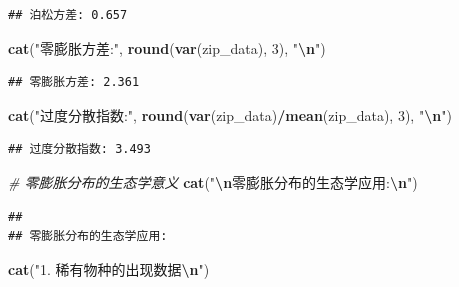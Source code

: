 \documentclass[
  twoside]{book}
\newenvironment{Shaded}{\begin{snugshade}}{\end{snugshade}}
\newcommand{\CommentTok}[1]{\textcolor[rgb]{0.56,0.35,0.01}{\textit{#1}}}
\newcommand{\DecValTok}[1]{\textcolor[rgb]{0.00,0.00,0.81}{#1}}
\newcommand{\FunctionTok}[1]{\textcolor[rgb]{0.13,0.29,0.53}{\textbf{#1}}}
\newcommand{\NormalTok}[1]{#1}
\newcommand{\SpecialCharTok}[1]{\textcolor[rgb]{0.81,0.36,0.00}{\textbf{#1}}}
\newcommand{\StringTok}[1]{\textcolor[rgb]{0.31,0.60,0.02}{#1}}
\begin{document}
\begin{verbatim}
## 泊松方差: 0.657
\end{verbatim}

\begin{Shaded}
\begin{Highlighting}[]
\FunctionTok{cat}\NormalTok{(}\StringTok{"零膨胀方差:"}\NormalTok{, }\FunctionTok{round}\NormalTok{(}\FunctionTok{var}\NormalTok{(zip\_data), }\DecValTok{3}\NormalTok{), }\StringTok{"}\SpecialCharTok{\textbackslash{}n}\StringTok{"}\NormalTok{)}
\end{Highlighting}
\end{Shaded}

\begin{verbatim}
## 零膨胀方差: 2.361
\end{verbatim}

\begin{Shaded}
\begin{Highlighting}[]
\FunctionTok{cat}\NormalTok{(}\StringTok{"过度分散指数:"}\NormalTok{, }\FunctionTok{round}\NormalTok{(}\FunctionTok{var}\NormalTok{(zip\_data)}\SpecialCharTok{/}\FunctionTok{mean}\NormalTok{(zip\_data), }\DecValTok{3}\NormalTok{), }\StringTok{"}\SpecialCharTok{\textbackslash{}n}\StringTok{"}\NormalTok{)}
\end{Highlighting}
\end{Shaded}

\begin{verbatim}
## 过度分散指数: 3.493
\end{verbatim}

\begin{Shaded}
\begin{Highlighting}[]
\CommentTok{\# 零膨胀分布的生态学意义}
\FunctionTok{cat}\NormalTok{(}\StringTok{"}\SpecialCharTok{\textbackslash{}n}\StringTok{零膨胀分布的生态学应用:}\SpecialCharTok{\textbackslash{}n}\StringTok{"}\NormalTok{)}
\end{Highlighting}
\end{Shaded}

\begin{verbatim}
## 
## 零膨胀分布的生态学应用:
\end{verbatim}

\begin{Shaded}
\begin{Highlighting}[]
\FunctionTok{cat}\NormalTok{(}\StringTok{"1. 稀有物种的出现数据}\SpecialCharTok{\textbackslash{}n}\StringTok{"}\NormalTok{)}
\end{Highlighting}
\end{Shaded}
\end{document}
